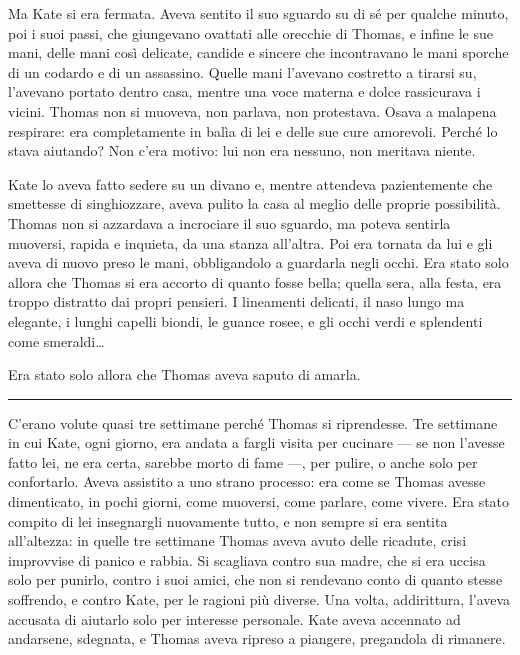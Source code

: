 \documentclass[a4paper,oneside,10pt]{memoir}
\begin{document}
Ma Kate si era fermata. Aveva sentito il suo sguardo su di sé per qualche minuto, poi i suoi passi, che giungevano
ovattati alle orecchie di Thomas, e infine le sue mani, delle mani così delicate, candide e sincere che incontravano
le mani sporche di un codardo e di un assassino. Quelle mani l'avevano costretto a tirarsi su, l'avevano portato dentro
casa, mentre una voce materna e dolce rassicurava i vicini. Thomas non si muoveva, non parlava, non protestava. Osava a
malapena respirare: era completamente in balìa di lei e delle sue cure amorevoli. Perché lo stava aiutando? Non c'era
motivo: lui non era nessuno, non meritava niente.

Kate lo aveva fatto sedere su un divano e, mentre attendeva pazientemente che smettesse di singhiozzare, aveva pulito la
casa al meglio delle proprie possibilità. Thomas non si azzardava a incrociare il suo sguardo, ma poteva sentirla
muoversi, rapida e inquieta, da una stanza all'altra. Poi era tornata da lui e gli aveva di nuovo preso le mani,
obbligandolo a guardarla negli occhi. Era stato solo allora che Thomas si era accorto di quanto fosse bella; quella
sera, alla festa, era troppo distratto dai propri pensieri. I lineamenti delicati, il naso lungo ma elegante, i lunghi
capelli biondi, le guance rosee, e gli occhi verdi e splendenti come smeraldi\dots{}

Era stato solo allora che Thomas aveva saputo di amarla.

\plainbreak{1}

C'erano volute quasi tre settimane perché Thomas si riprendesse. Tre settimane in cui Kate, ogni giorno, era andata a
fargli visita per cucinare --- se non l'avesse fatto lei, ne era certa, sarebbe morto di fame ---, per pulire, o anche
solo per confortarlo. Aveva assistito a uno strano processo: era come se Thomas avesse dimenticato, in pochi giorni,
come muoversi, come parlare, come vivere. Era stato compito di lei insegnargli nuovamente tutto, e non sempre si era
sentita all'altezza: in quelle tre settimane Thomas aveva avuto delle ricadute, crisi improvvise di panico e rabbia. Si
scagliava contro sua madre, che si era uccisa solo per punirlo, contro i suoi amici, che non si rendevano conto di
quanto stesse soffrendo, e contro Kate, per le ragioni più diverse. Una volta, addirittura, l'aveva accusata di aiutarlo
solo per interesse personale. Kate aveva accennato ad andarsene, sdegnata, e Thomas aveva ripreso a piangere, pregandola
di rimanere.
\end{document}
